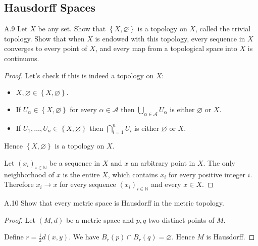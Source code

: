 \subsection{Hausdorff Spaces}

\begin{exercise}{A.9}
    Let \( X \) be any set. Show that \( \left\{ X, \varnothing \right\} \) is a topology on \( X \), called the trivial topology. Show that when \( X \) is endowed with this topology, every sequence in \( X \) converges to every point of \( X \), and every map from a topological space into \( X \) is continuous.
\end{exercise}

\begin{proof}
    Let's check if this is indeed a topology on \( X \):
    \begin{itemize}
        \item \( X, \varnothing \in \left\{ X, \varnothing \right\} \).
        \item If \( U_{\alpha} \in \left\{ X, \varnothing \right\} \) for every \( \alpha \in \mathscr{A} \) then \( \bigcup_{\alpha\in\mathscr{A}} U_{\alpha} \) is either \( \varnothing \) or \( X \).
        \item If \( U_{1}, \ldots, U_{n} \in \left\{ X, \varnothing \right\} \) then \( \bigcap_{i=1}^{n} U_{i} \) is either \( \varnothing \) or \( X \).
    \end{itemize}

    Hence \( \left\{ X, \varnothing \right\} \) is a topology on \( X \).

    Let \( {(x_{i})}_{i\in\mathbb{N}} \) be a sequence in \( X \) and \( x \) an arbitrary point in \( X \). The only neighborhood of \( x \) is the entire \( X \), which contains \( x_{i} \) for every positive integer \( i \). Therefore \( x_{i} \to x \) for every sequence \( {(x_{i})}_{i\in\mathbb{N}} \) and every \( x \in X \).
\end{proof}

\begin{exercise}{A.10}
    Show that every metric space is Hausdorff in the metric topology.
\end{exercise}

\begin{proof}
    Let \( (M, d) \) be a metric space and \( p, q \) two distinct points of \( M \).

    Define \( r = \frac{1}{2} d(x, y) \). We have \( B_{r}(p) \cap B_{r}(q) = \varnothing \). Hence \( M \) is Hausdorff.
\end{proof}

